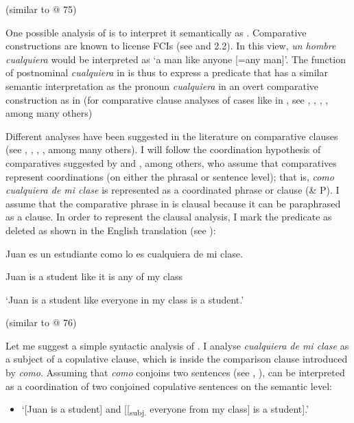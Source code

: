 \documentclass[output=paper]{langscibook}
\begin{document}
  (similar to @ 75)

  One possible analysis of  is to interpret it semantically as . Comparative constructions are known to license FCIs (see \citealt{Aloni2021} and 2.2). In this view, \textit{un hombre cualquiera} would be interpreted as ‘a man like anyone [=any man]’. The function of postnominal \textit{cualquiera} in  is thus to express a predicate that has a similar semantic interpretation as the pronoun \textit{cualquiera} in an overt comparative construction as in  (for comparative clause analyses of cases like in , see \citealt{Bresnan1973}, \citealt{NesporNapoli1986}, \citealt{Sáez1992}, \citealt{Kennedy1999}, among many others)

  Different analyses have been suggested in the literature on comparative clauses (see \citealt{Bresnan1973}, \citealt{NesporNapoli1986}, \citealt{Sáez1992}, \citealt{Kennedy1999}, among many others). I will follow the coordination hypothesis of comparatives suggested by \citet{NesporNapoli1986} and \citet{Sáez1992}, among others, who assume that comparatives represent coordinations (on either the phrasal or sentence level); that is, \textit{como cualquiera de mi clase} is represented as a coordinated phrase or clause (\& P). I assume that the comparative phrase in  is clausal because it can be paraphrased as a clause. In order to represent the clausal analysis, I mark the predicate as deleted as shown in the English translation (see \citealt{Bresnan1973}):

\label{bkm:Ref72354047}  Juan es un estudiante como lo es cualquiera de mi clase.

  Juan is a student like it is any of my class

  ‘Juan is a student like everyone in my class is a student.’

  (similar to @ 76)

Let me suggest a simple syntactic analysis of . I analyse \textit{cualquiera de mi clase} as a subject of a copulative clause, which is inside the comparison clause introduced by \textit{como}. Assuming that \textit{como} conjoins two sentences (see \citealt{NesporNapoli1986}, \citealt{Sáez1992}),  can be interpreted as a coordination of two conjoined copulative sentences on the semantic level:

\begin{itemize}
\item ‘[Juan is a student] and [[\textsubscript{subj.} everyone from my class] is a student].’
\end{itemize}
\end{document}
